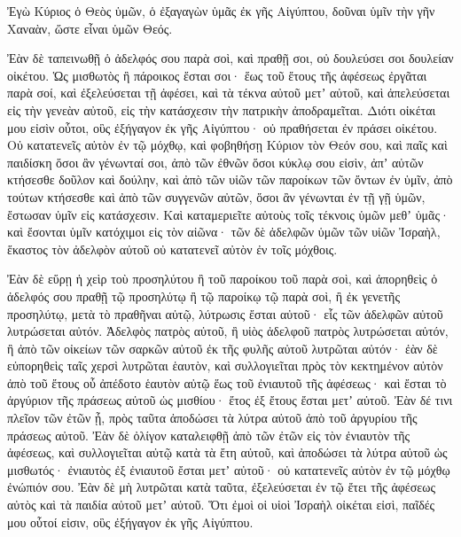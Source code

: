 {Ἐγὼ Κύριος ὁ Θεὸς ὑμῶν, ὁ ἐξαγαγὼν ὑμᾶς ἐκ γῆς Αἰγύπτου, δοῦναι ὑμῖν τὴν γῆν Χαναὰν, ὥστε εἶναι ὑμῶν Θεός.
\par }{\PP {}Ἐὰν δὲ ταπεινωθῇ ὁ ἀδελφός σου παρὰ σοὶ, καὶ πραθῇ σοι, οὐ δουλεύσει σοι δουλείαν οἰκέτου.
Ὡς μισθωτὸς ἢ πάροικος ἔσται σοι· ἕως τοῦ ἔτους τῆς ἀφέσεως ἐργᾶται παρὰ σοί,
καὶ ἐξελεύσεται τῇ ἀφέσει, καὶ τὰ τέκνα αὐτοῦ μετʼ αὐτοῦ, καὶ ἀπελεύσεται εἰς τὴν γενεὰν αὐτοῦ, εἰς τὴν κατάσχεσιν τὴν πατρικὴν ἀποδραμεῖται.
Διότι οἰκέται μου εἰσὶν οὗτοι, οὓς ἐξήγαγον ἐκ γῆς Αἰγύπτου· οὐ πραθήσεται ἐν πράσει οἰκέτου.
Οὐ κατατενεῖς αὐτὸν ἐν τῷ μόχθῳ, καὶ φοβηθήσῃ Κύριον τὸν Θεόν σου,
καὶ παῖς καὶ παιδίσκη ὅσοι ἂν γένωνταί σοι, ἀπὸ τῶν ἐθνῶν ὅσοι κύκλῳ σου εἰσὶν, ἀπʼ αὐτῶν κτήσεσθε δοῦλον καὶ δούλην,
καὶ ἀπὸ τῶν υἱῶν τῶν παροίκων τῶν ὄντων ἐν ὑμῖν, ἀπὸ τούτων κτήσεσθε καὶ ἀπὸ τῶν συγγενῶν αὐτῶν, ὅσοι ἂν γένωνται ἐν τῇ γῇ ὑμῶν, ἔστωσαν ὑμῖν εἰς κατάσχεσιν.
Καὶ καταμεριεῖτε αὐτοὺς τοῖς τέκνοις ὑμῶν μεθʼ ὑμᾶς· καὶ ἔσονται ὑμῖν κατόχιμοι εἰς τὸν αἰῶνα· τῶν δὲ ἀδελφῶν ὑμῶν τῶν υἱῶν Ἰσραὴλ, ἕκαστος τὸν ἀδελφὸν αὐτοῦ οὐ κατατενεῖ αὐτὸν ἐν τοῖς μόχθοις.
\par }{\PP {}Ἐὰν δὲ εὕρῃ ἡ χεὶρ τοὺ προσηλύτου ἢ τοῦ παροίκου τοῦ παρὰ σοὶ, καὶ ἀπορηθεὶς ὁ ἀδελφός σου πραθῇ τῷ προσηλύτῳ ἢ τῷ παροίκῳ τῷ παρὰ σοὶ, ἢ ἐκ γενετῆς προσηλύτῳ,
μετὰ τὸ πραθῆναι αὐτῷ, λύτρωσις ἔσται αὐτοῦ· εἷς τῶν ἀδελφῶν αὐτοῦ λυτρώσεται αὐτόν.
Ἀδελφὸς πατρὸς αὐτοῦ, ἢ υἱὸς ἀδελφοῦ πατρὸς λυτρώσεται αὐτόν, ἢ ἀπὸ τῶν οἰκείων τῶν σαρκῶν αὐτοῦ ἐκ τῆς φυλῆς αὐτοῦ λυτρῶται αὐτόν· ἐὰν δὲ εὐπορηθεὶς ταῖς χερσὶ λυτρῶται ἑαυτὸν,
καὶ συλλογιεῖται πρὸς τὸν κεκτημένον αὐτὸν ἀπὸ τοῦ ἔτους οὗ ἀπέδοτο ἑαυτὸν αὐτῷ ἕως τοῦ ἐνιαυτοῦ τῆς ἀφέσεως· καὶ ἔσται τὸ ἀργύριον τῆς πράσεως αὐτοῦ ὡς μισθίου· ἔτος ἐξ ἔτους ἔσται μετʼ αὐτοῦ.
Ἐὰν δέ τινι πλεῖον τῶν ἐτῶν ᾖ, πρὸς ταῦτα ἀποδώσει τὰ λύτρα αὐτοῦ ἀπὸ τοῦ ἀργυρίου τῆς πράσεως αὐτοῦ.
Ἐὰν δὲ ὀλίγον καταλειφθῇ ἀπὸ τῶν ἐτῶν εἰς τὸν ἐνιαυτὸν τῆς ἀφέσεως, καὶ συλλογιεῖται αὐτῷ κατὰ τὰ ἔτη αὐτοῦ, καὶ ἀποδώσει τὰ λύτρα αὐτοῦ ὡς μισθωτός·
ἐνιαυτὸς ἐξ ἐνιαυτοῦ ἔσται μετʼ αὐτοῦ· οὐ κατατενεῖς αὐτὸν ἐν τῷ μόχθῳ ἐνώπιόν σου.
Ἐὰν δὲ μὴ λυτρῶται κατὰ ταῦτα, ἐξελεύσεται ἐν τῷ ἔτει τῆς ἀφέσεως αὐτὸς καὶ τὰ παιδία αὐτοῦ μετʼ αὐτοῦ.
Ὅτι ἐμοὶ οἱ υἱοὶ Ἰσραὴλ οἰκέται εἰσὶ, παῖδές μου οὗτοί εἰσιν, οὓς ἐξήγαγον ἐκ γῆς Αἰγύπτου.

}
